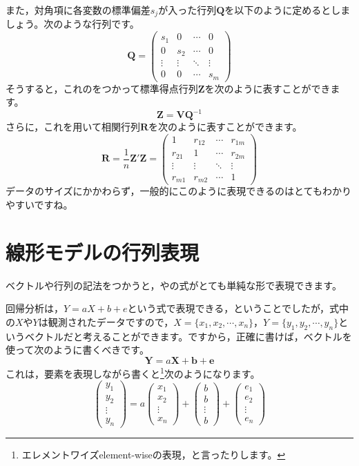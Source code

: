 \documentclass{ltjsbook}
\begin{document}
また，対角項に各変数の標準偏差$s_j$が入った行列$\bm{Q}$を以下のように定めるとしましょう。次のような行列です。
\[ \bm{Q} = \begin{pmatrix} s_1    & 0      & \cdots & 0      \\
                0      & s_2    & \cdots & 0      \\
                \vdots & \vdots & \ddots & \vdots \\
                0      & 0      & \cdots & s_m\end{pmatrix} \]
そうすると，これのをつかって標準得点行列$\bm{Z}$を次のように表すことができます。
\[ \bm{Z} = \bm{V} \bm{Q}^{-1} \]
さらに，これを用いて相関行列$\bm{R}$を次のように表すことができます。
\[ \bm{R} = \frac{1}{n}\bm{Z}' \bm{Z} = \begin{pmatrix} 1      & r_{12} & \cdots & r_{1m} \\
                r_{21} & 1      & \cdots & r_{2m} \\
                \vdots & \vdots & \ddots & \vdots \\
                r_{m1} & r_{m2} & \cdots & 1\end{pmatrix} \]
データのサイズにかかわらず，一般的にこのように表現できるのはとてもわかりやすいですね。

\section{線形モデルの行列表現}
ベクトルや行列の記法をつかうと，やの式がとても単純な形で表現できます。

回帰分析は，$Y=aX+b+e$という式で表現できる，ということでしたが，式中の$X$や$Y$は観測されたデータですので，$X=\{x_1,x_2,\cdots,x_n\}$，$Y=\{y_1,y_2,\cdots,y_n\}$というベクトルだと考えることができます。ですから，正確に書けば，ベクトルを使って次のように書くべきです。
\[ \bm{Y} = a\bm{X} + \bm{b} + \bm{e}\]
これは，要素を表現しながら書くと\footnote{エレメントワイズelement-wiseの表現，と言ったりします。}次のようになります。
\[
	\begin{pmatrix}
		y_1    \\
		y_2    \\
		\vdots \\
		y_n
	\end{pmatrix}
	=a
	\begin{pmatrix}
		x_1    \\
		x_2    \\
		\vdots \\
		x_n
	\end{pmatrix}
	+
	\begin{pmatrix}
		b      \\
		b      \\
		\vdots \\
		b
	\end{pmatrix}
	+
	\begin{pmatrix}
		e_1    \\
		e_2    \\
		\vdots \\
		e_n
	\end{pmatrix}
\]
\end{document}
